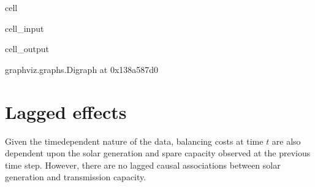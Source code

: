 \documentclass[letterpaper,10pt,english]{jupyterBook}
\begin{document}
\begin{sphinxuseclass}{cell}\begin{sphinxVerbatimInput}

\begin{sphinxuseclass}{cell_input}
\begin{sphinxVerbatim}[commandchars=\\\{\}]
  \PYG{p}{[}  \PYG{p}{]}
 
\end{sphinxVerbatim}

\end{sphinxuseclass}\end{sphinxVerbatimInput}
\begin{sphinxVerbatimOutput}

\begin{sphinxuseclass}{cell_output}
\begin{sphinxVerbatim}[commandchars=\\\{\}]
\PYGZlt{}graphviz.graphs.Digraph at 0x138a587d0\PYGZgt{}
\end{sphinxVerbatim}

\end{sphinxuseclass}\end{sphinxVerbatimOutput}

\end{sphinxuseclass}

\section{Lagged effects}
\label{\detokenize{notebooks/semiparametric_varlingam:lagged-effects}}
\sphinxAtStartPar
Given the time\sphinxhyphen{}dependent nature of the data, balancing costs at time \(t\) are also dependent upon the solar generation and spare capacity observed at the previous time step. However, there are no lagged causal associations between solar generation and transmission capacity.
\end{document}
